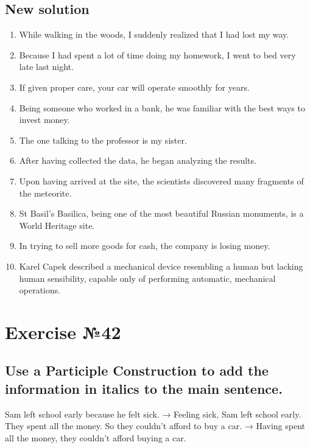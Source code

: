 \subsection*{New solution}
\begin{enumerate}
      \item While walking in the woods, I suddenly realized that I had lost my way.
      \item Because I had spent a lot of time doing my homework, I went to bed very late last night.
      \item If given proper care, your car will operate smoothly for years.
      \item Being someone who worked in a bank, he was familiar with the best ways to invest money.
      \item The one talking to the professor is my sister.
      \item After having collected the data, he began analyzing the results.
      \item Upon having arrived at the site, the scientists discovered many fragments of the meteorite.
      \item St Basil’s Basilica, being one of the most beautiful Russian monuments, is a World Heritage site.
      \item In trying to sell more goods for cash, the company is losing money.
      \item Karel Capek described a mechanical device resembling a human but lacking human sensibility, capable only of performing automatic, mechanical operations.
\end{enumerate}

\section{Exercise №42}
\subsection*{Use a Participle Construction to add the information in italics to the main
      sentence.}
 Sam left school early because he felt sick. → Feeling sick, Sam
left school early. They spent all the money. So they couldn’t afford to buy a car. →
Having spent all the money, they couldn’t afford buying a car.

